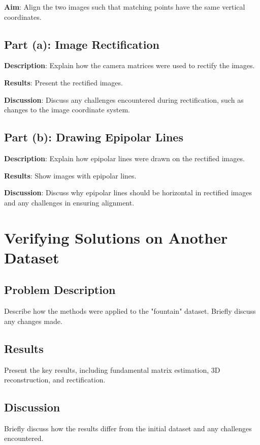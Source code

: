 \documentclass{article}
\begin{document}
\textbf{Aim}: Align the two images such that matching points have the same vertical coordinates.

\subsection{Part (a): Image Rectification}
\textbf{Description}: Explain how the camera matrices were used to rectify the images.

\textbf{Results}: Present the rectified images.


\textbf{Discussion}: Discuss any challenges encountered during rectification, such as changes to the image coordinate system.

\subsection{Part (b): Drawing Epipolar Lines}
\textbf{Description}: Explain how epipolar lines were drawn on the rectified images.

\textbf{Results}: Show images with epipolar lines.


\textbf{Discussion}: Discuss why epipolar lines should be horizontal in rectified images and any challenges in ensuring alignment.

\section{Verifying Solutions on Another Dataset}
\subsection{Problem Description}
Describe how the methods were applied to the "fountain" dataset. Briefly discuss any changes made.

\subsection{Results}
Present the key results, including fundamental matrix estimation, 3D reconstruction, and rectification.

\subsection{Discussion}
Briefly discuss how the results differ from the initial dataset and any challenges encountered.
\end{document}
